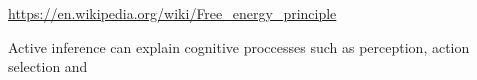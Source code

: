\documentclass[a4paper]{article}
\title{}
\date{}
\author{Mohammad Rahmani}
\begin{document}
   \maketitle

   \url{https://en.wikipedia.org/wiki/Free_energy_principle}
   
   \seeherefooter{}
   Active inference can explain cognitive proccesses such as perception, action selection and

   
   
\end{document}
